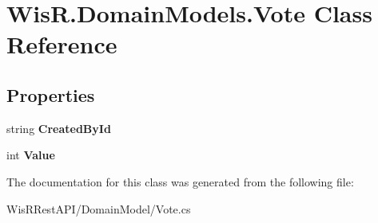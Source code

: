 \hypertarget{class_wis_r_1_1_domain_models_1_1_vote}{}\section{Wis\+R.\+Domain\+Models.\+Vote Class Reference}
\label{class_wis_r_1_1_domain_models_1_1_vote}
\subsection*{Properties}
\begin{DoxyCompactItemize}
\item 
\hypertarget{class_wis_r_1_1_domain_models_1_1_vote_a38b08c101028857b8b72a5ec6daa74be}{}string {\bfseries Created\+By\+Id}\label{class_wis_r_1_1_domain_models_1_1_vote_a38b08c101028857b8b72a5ec6daa74be}

\item 
\hypertarget{class_wis_r_1_1_domain_models_1_1_vote_a5adf93a60cd78b70b9a5df38185dec6c}{}int {\bfseries Value}\label{class_wis_r_1_1_domain_models_1_1_vote_a5adf93a60cd78b70b9a5df38185dec6c}

\end{DoxyCompactItemize}


The documentation for this class was generated from the following file\+:\begin{DoxyCompactItemize}
\item 
Wis\+R\+Rest\+A\+P\+I/\+Domain\+Model/Vote.\+cs\end{DoxyCompactItemize}
